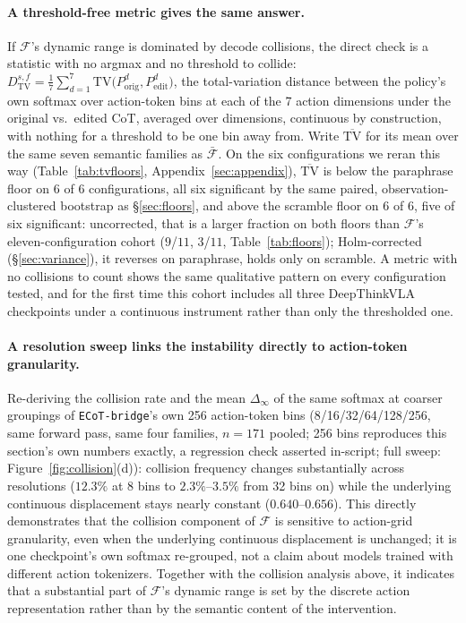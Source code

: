 \documentclass{article}
\begin{document}
\paragraph{A threshold-free metric gives the same answer.} If $\mathcal{F}$'s dynamic range is dominated by decode collisions, the direct check is a statistic with no argmax and no threshold to collide: $D_{\text{TV}}^{s,f} = \tfrac{1}{7}\sum_{d=1}^{7}\mathrm{TV}\bigl(P_{\text{orig}}^d, P_{\text{edit}}^d\bigr)$, the total-variation distance between the policy's own softmax over action-token bins at each of the 7 action dimensions under the original vs.\ edited CoT, averaged over dimensions, continuous by construction, with nothing for a threshold to be one bin away from. Write $\overline{\text{TV}}$ for its mean over the same seven semantic families as $\bar{\mathcal{F}}$. On the six configurations we reran this way (Table~\ref{tab:tvfloors}, Appendix~\ref{sec:appendix}), $\overline{\text{TV}}$ is below the paraphrase floor on 6 of 6 configurations, all six significant by the same paired, observation-clustered bootstrap as \S\ref{sec:floors}, and above the scramble floor on 6 of 6, five of six significant: uncorrected, that is a larger fraction on both floors than $\mathcal{F}$'s eleven-configuration cohort ($9$/$11$, $3$/$11$, Table~\ref{tab:floors}); Holm-corrected (\S\ref{sec:variance}), it reverses on paraphrase, holds only on scramble. A metric with no collisions to count shows the same qualitative pattern on every configuration tested, and for the first time this cohort includes all three DeepThinkVLA checkpoints under a continuous instrument rather than only the thresholded one.

\paragraph{A resolution sweep links the instability directly to action-token granularity.} Re-deriving the collision rate and the mean $\Delta_\infty$ of the same softmax at coarser groupings of \texttt{ECoT-bridge}'s own 256 action-token bins (8/16/32/64/128/256, same forward pass, same four families, $n{=}171$ pooled; 256 bins reproduces this section's own numbers exactly, a regression check asserted in-script; full sweep: Figure~\ref{fig:collision}(d)): collision frequency changes substantially across resolutions ($12.3\%$ at 8 bins to $2.3\%$--$3.5\%$ from 32 bins on) while the underlying continuous displacement stays nearly constant ($0.640$--$0.656$). This directly demonstrates that the collision component of $\mathcal{F}$ is sensitive to action-grid granularity, even when the underlying continuous displacement is unchanged; it is one checkpoint's own softmax re-grouped, not a claim about models trained with different action tokenizers. Together with the collision analysis above, it indicates that a substantial part of $\mathcal{F}$'s dynamic range is set by the discrete action representation rather than by the semantic content of the intervention.
\end{document}
